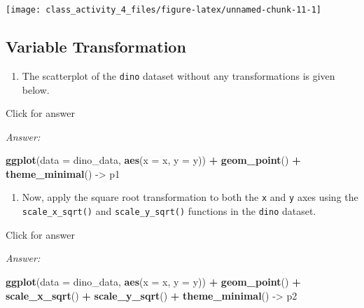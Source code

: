 \documentclass[
]{book}
\newenvironment{Shaded}{\begin{snugshade}}{\end{snugshade}}
\newcommand{\AttributeTok}[1]{\textcolor[rgb]{0.13,0.29,0.53}{#1}}
\newcommand{\FunctionTok}[1]{\textcolor[rgb]{0.13,0.29,0.53}{\textbf{#1}}}
\newcommand{\NormalTok}[1]{#1}
\newcommand{\OtherTok}[1]{\textcolor[rgb]{0.56,0.35,0.01}{#1}}
\newcommand{\SpecialCharTok}[1]{\textcolor[rgb]{0.81,0.36,0.00}{\textbf{#1}}}
\providecommand{\tightlist}{%
  \setlength{\itemsep}{0pt}\setlength{\parskip}{0pt}}
\begin{document}
\texttt{[image: class\_activity\_4\_files/figure-latex/unnamed-chunk-11-1]}

\hypertarget{variable-transformation}{%
\subsection{Variable Transformation}\label{variable-transformation}}

\begin{enumerate}
\def\labelenumi{\alph{enumi}.}
\tightlist
\item
  The scatterplot of the \texttt{dino} dataset without any transformations is given below.
\end{enumerate}

Click for answer

\emph{Answer:}

\begin{Shaded}
\begin{Highlighting}[]
\FunctionTok{ggplot}\NormalTok{(}\AttributeTok{data =}\NormalTok{ dino\_data, }\FunctionTok{aes}\NormalTok{(}\AttributeTok{x =}\NormalTok{ x, }\AttributeTok{y =}\NormalTok{ y)) }\SpecialCharTok{+}
  \FunctionTok{geom\_point}\NormalTok{() }\SpecialCharTok{+}
  \FunctionTok{theme\_minimal}\NormalTok{() }\OtherTok{{-}\textgreater{}}\NormalTok{ p1}
\end{Highlighting}
\end{Shaded}

\begin{enumerate}
\def\labelenumi{\alph{enumi}.}
\setcounter{enumi}{1}
\tightlist
\item
  Now, apply the square root transformation to both the \texttt{x} and \texttt{y} axes using the \texttt{scale\_x\_sqrt()} and \texttt{scale\_y\_sqrt()} functions in the \texttt{dino} dataset.
\end{enumerate}

Click for answer

\emph{Answer:}

\begin{Shaded}
\begin{Highlighting}[]
\FunctionTok{ggplot}\NormalTok{(}\AttributeTok{data =}\NormalTok{ dino\_data, }\FunctionTok{aes}\NormalTok{(}\AttributeTok{x =}\NormalTok{ x, }\AttributeTok{y =}\NormalTok{ y)) }\SpecialCharTok{+}
  \FunctionTok{geom\_point}\NormalTok{() }\SpecialCharTok{+}
  \FunctionTok{scale\_x\_sqrt}\NormalTok{() }\SpecialCharTok{+}
  \FunctionTok{scale\_y\_sqrt}\NormalTok{() }\SpecialCharTok{+}
  \FunctionTok{theme\_minimal}\NormalTok{() }\OtherTok{{-}\textgreater{}}\NormalTok{ p2}
\end{Highlighting}
\end{Shaded}
\end{document}
